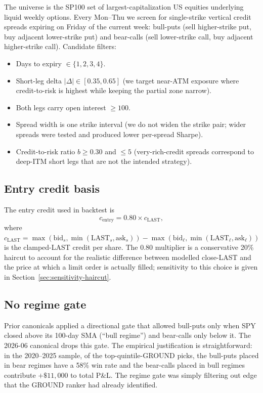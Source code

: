 \documentclass[11pt]{article}
\theoremstyle{definition}
\theoremstyle{remark}
\begin{document}
The universe is the SP100 set of largest-capitalization US equities
underlying liquid weekly options. Every Mon--Thu we screen for
single-strike vertical credit spreads expiring on Friday of the
current week: bull-puts (sell higher-strike put, buy adjacent
lower-strike put) and bear-calls (sell lower-strike call, buy adjacent
higher-strike call). Candidate filters:
\begin{itemize}
\item Days to expiry $\in \{1, 2, 3, 4\}$.
\item Short-leg delta $|\Delta| \in [0.35, 0.65]$ (we target near-ATM
exposure where credit-to-risk is highest while keeping the partial
zone narrow).
\item Both legs carry open interest $\geq 100$.
\item Spread width is one strike interval (we do not widen the strike
pair; wider spreads were tested and produced lower per-spread Sharpe).
\item Credit-to-risk ratio $b \geq 0.30$ and $\leq 5$ (very-rich-credit
spreads correspond to deep-ITM short legs that are not the intended
strategy).
\end{itemize}

\subsection{Entry credit basis}
\label{sec:entry-credit}

The entry credit used in backtest is
\[
c_{\mathrm{entry}} = 0.80 \times c_{\mathrm{LAST}},
\]
where $c_{\mathrm{LAST}} = \max(\mathrm{bid}_s, \min(\mathrm{LAST}_s, \mathrm{ask}_s))
- \max(\mathrm{bid}_\ell, \min(\mathrm{LAST}_\ell, \mathrm{ask}_\ell))$ is
the clamped-LAST credit per share. The 0.80 multiplier is a
conservative 20\% haircut to account for the realistic difference
between modelled close-LAST and the price at which a limit order is
actually filled; sensitivity to this choice is given in
Section~\ref{sec:sensitivity-haircut}.

\subsection{No regime gate}
\label{sec:no-regime}

Prior canonicals applied a directional gate that allowed bull-puts
only when SPY closed above its 100-day SMA (``bull regime'') and
bear-calls only below it. The 2026-06 canonical drops this gate. The
empirical justification is straightforward: in the 2020--2025 sample,
of the top-quintile-GROUND picks, the bull-puts placed in bear regimes
have a 58\% win rate and the bear-calls placed in bull regimes
contribute $+\$11{,}000$ to total P\&L. The regime gate was simply
filtering out edge that the GROUND ranker had already identified.
\end{document}
